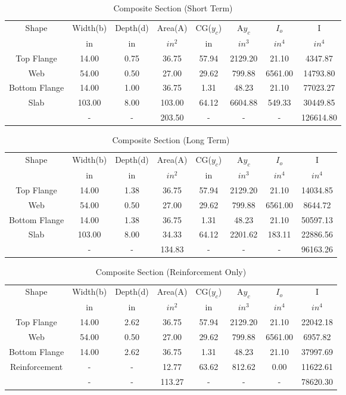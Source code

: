 \documentclass[11pt]{book}
\begin{document}
\begin{table}[H]
\centering
\caption{Composite Section (Short Term)}\begin{tabular}{|c|c|c|c|c|c|c|c|}
\hline
Shape &Width(b)     &Depth(d)  &Area(A)   &CG($y_c$)    &A$y_c$     &$I_o$    &I      \\
      &in           &in        &$in^2$    &in           &$in^3$     &$in^4$   &$in^4$  \\
\hline
Top Flange  &14.00 &0.75 &36.75 &57.94 &2129.20 &21.10 &4347.87\\ \hline
Web  &54.00 &0.50 &27.00 &29.62 &799.88 &6561.00 &14793.80\\ \hline
Bottom Flange  &14.00 &1.00 &36.75 &1.31 &48.23 &21.10 &77023.27\\ \hline
Slab &103.00 &8.00 &103.00 &64.12 &6604.88 &549.33 &30449.85\\ \hline
  &- &- &203.50 &- &- &- &126614.80\\ \hline
\end{tabular}
\end{table}
\begin{table}[H]
\centering
\caption{Composite Section (Long Term)}\begin{tabular}{|c|c|c|c|c|c|c|c|}
\hline
Shape &Width(b)     &Depth(d)  &Area(A)   &CG($y_c$)    &A$y_c$     &$I_o$    &I      \\
      &in           &in        &$in^2$    &in           &$in^3$     &$in^4$   &$in^4$  \\
\hline
Top Flange  &14.00 &1.38 &36.75 &57.94 &2129.20 &21.10 &14034.85\\ \hline
Web  &54.00 &0.50 &27.00 &29.62 &799.88 &6561.00 &8644.72\\ \hline
Bottom Flange  &14.00 &1.38 &36.75 &1.31 &48.23 &21.10 &50597.13\\ \hline
Slab &103.00 &8.00 &34.33 &64.12 &2201.62 &183.11 &22886.56\\ \hline
  &- &- &134.83 &- &- &- &96163.26\\ \hline
\end{tabular}
\end{table}
\begin{table}[H]
\centering
\caption{Composite Section (Reinforcement Only)}\begin{tabular}{|c|c|c|c|c|c|c|c|}
\hline
Shape &Width(b)     &Depth(d)  &Area(A)   &CG($y_c$)    &A$y_c$     &$I_o$    &I      \\
      &in           &in        &$in^2$    &in           &$in^3$     &$in^4$   &$in^4$  \\
\hline
Top Flange  &14.00 &2.62 &36.75 &57.94 &2129.20 &21.10 &22042.18\\ \hline
Web  &54.00 &0.50 &27.00 &29.62 &799.88 &6561.00 &6957.82\\ \hline
Bottom Flange  &14.00 &2.62 &36.75 &1.31 &48.23 &21.10 &37997.69\\ \hline
Reinforcement &- &- &12.77 &63.62 &812.62 &0.00 &11622.61\\ \hline
  &- &- &113.27 &- &- &- &78620.30\\ \hline
\end{tabular}
\end{table}
\end{document}
